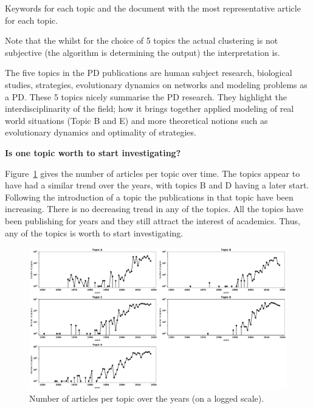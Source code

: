 \documentclass{article}
\theoremstyle{definition}
\begin{document}
\begin{table}[!hbtp]
    \begin{center}
    \resizebox{\textwidth}{!}{
    }
    \end{center}
    \caption{Keywords for each topic and the document with the most representative article for each topic.}
    \label{table:topics_and_articles}
\end{table}

Note that the whilst for the choice of 5 topics the actual clustering is not
subjective (the algorithm is determining the output) the interpretation is.

The five topics in the PD publications are human subject research, biological
studies, strategies, evolutionary dynamics on networks and  modeling problems as
a PD. These 5 topics nicely summarise the PD research. They highlight the
interdisciplinarity of the field; how it brings together applied modeling of
real world situations (Topic B and E) and more theoretical notions such as
evolutionary dynamics and optimality of strategies.

\textbf{Is one topic worth to start investigating?}

Figure~\ref{fig:number_of_articles_per_topic} gives the number of articles
per topic over time. The topics appear to have had a similar trend over the years,
with topics B and D having a later start. Following the introduction of a topic
the publications in that topic have been increasing. There is no decreasing
trend in any of the topics. All the topics have been publishing for years and
they still attract the interest of academics. Thus, any of the topics is
worth to start investigating.

\begin{figure}[!hbtp]
    \centering
    \includegraphics[width=\textwidth]{./assets/images/papers_per_topic_over_time.pdf}
    \caption{Number of articles per topic over the years (on a logged scale).}\label{fig:number_of_articles_per_topic}
\end{figure}
\end{document}

